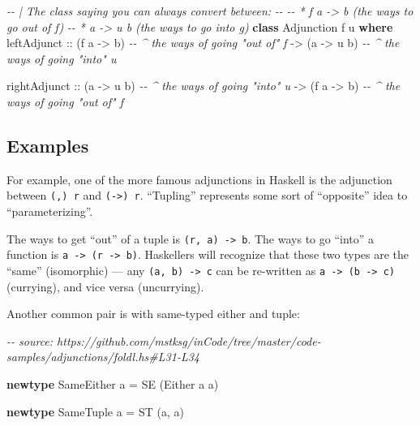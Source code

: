 \documentclass[]{article}
\newenvironment{Shaded}{}{}
\newcommand{\CommentTok}[1]{\textcolor[rgb]{0.38,0.63,0.69}{\textit{#1}}}
\newcommand{\DataTypeTok}[1]{\textcolor[rgb]{0.56,0.13,0.00}{#1}}
\newcommand{\KeywordTok}[1]{\textcolor[rgb]{0.00,0.44,0.13}{\textbf{#1}}}
\newcommand{\NormalTok}[1]{#1}
\newcommand{\OtherTok}[1]{\textcolor[rgb]{0.00,0.44,0.13}{#1}}
\begin{document}
\begin{Shaded}
\begin{Highlighting}[]
\CommentTok{{-}{-} | The class saying you can always convert between:}
\CommentTok{{-}{-}}
\CommentTok{{-}{-} * \textasciigrave{}f a {-}\textgreater{} b\textasciigrave{} (the ways to go out of \textasciigrave{}f\textasciigrave{})}
\CommentTok{{-}{-} * \textasciigrave{}a {-}\textgreater{} u b\textasciigrave{} (the ways to go into \textasciigrave{}g\textasciigrave{})}
\KeywordTok{class} \DataTypeTok{Adjunction}\NormalTok{ f u }\KeywordTok{where}
\NormalTok{    leftAdjunct}
\OtherTok{        ::}\NormalTok{ (f a }\OtherTok{{-}\textgreater{}}\NormalTok{ b)       }\CommentTok{{-}{-} \^{} the ways of going "out of" \textasciigrave{}f\textasciigrave{}}
        \OtherTok{{-}\textgreater{}}\NormalTok{ (a }\OtherTok{{-}\textgreater{}}\NormalTok{ u b)       }\CommentTok{{-}{-} \^{} the ways of going "into" \textasciigrave{}u\textasciigrave{}}

\NormalTok{    rightAdjunct}
\OtherTok{        ::}\NormalTok{ (a }\OtherTok{{-}\textgreater{}}\NormalTok{ u b)       }\CommentTok{{-}{-} \^{} the ways of going "into" u}
        \OtherTok{{-}\textgreater{}}\NormalTok{ (f a }\OtherTok{{-}\textgreater{}}\NormalTok{ b)       }\CommentTok{{-}{-} \^{} the ways of going "out of" f}
\end{Highlighting}
\end{Shaded}

\subsection{Examples}\label{examples}

For example, one of the more famous adjunctions in Haskell is the adjunction
between \texttt{(,)\ r} and \texttt{(-\textgreater{})\ r}. ``Tupling''
represents some sort of ``opposite'' idea to ``parameterizing''.

The ways to get ``out'' of a tuple is \texttt{(r,\ a)\ -\textgreater{}\ b}. The
ways to go ``into'' a function is
\texttt{a\ -\textgreater{}\ (r\ -\textgreater{}\ b)}. Haskellers will recognize
that these two types are the ``same'' (isomorphic) --- any
\texttt{(a,\ b)\ -\textgreater{}\ c} can be re-written as
\texttt{a\ -\textgreater{}\ (b\ -\textgreater{}\ c)} (currying), and vice versa
(uncurrying).

Another common pair is with same-typed either and tuple:

\begin{Shaded}
\begin{Highlighting}[]
\CommentTok{{-}{-} source: https://github.com/mstksg/inCode/tree/master/code{-}samples/adjunctions/foldl.hs\#L31{-}L34}

\KeywordTok{newtype} \DataTypeTok{SameEither}\NormalTok{ a }\OtherTok{=} \DataTypeTok{SE}\NormalTok{ (}\DataTypeTok{Either}\NormalTok{ a a)}

\KeywordTok{newtype} \DataTypeTok{SameTuple}\NormalTok{  a }\OtherTok{=} \DataTypeTok{ST}\NormalTok{ (a, a)}
\end{Highlighting}
\end{Shaded}
\end{document}
